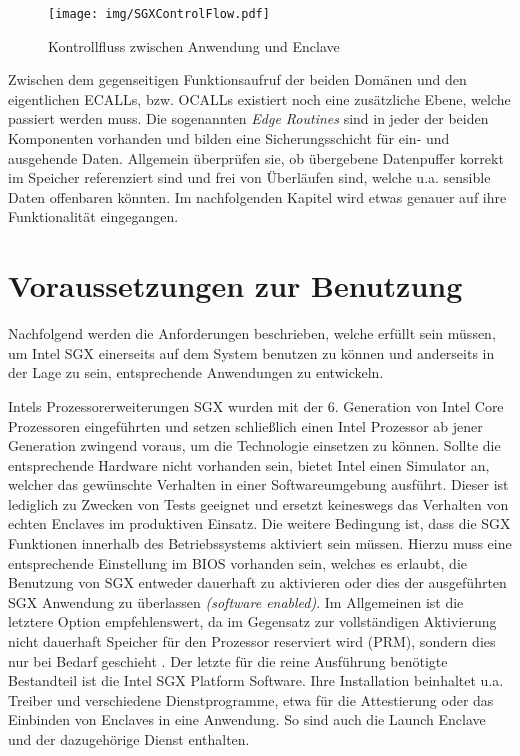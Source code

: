 \begin{figure}[h]
	\texttt{[image: img/SGXControlFlow.pdf]}
	\centering
	\caption{Kontrollfluss zwischen Anwendung und Enclave}
	\label{fig:sgxcontrolflow}
\end{figure}

Zwischen dem gegenseitigen Funktionsaufruf der beiden Domänen und den eigentlichen ECALLs, bzw. OCALLs existiert noch eine zusätzliche Ebene, welche passiert werden muss. Die sogenannten \textit{Edge Routines} sind in jeder der beiden Komponenten vorhanden und bilden eine Sicherungsschicht für ein- und ausgehende Daten. Allgemein überprüfen sie, ob übergebene Datenpuffer korrekt im Speicher referenziert sind und frei von Überläufen sind, welche u.a. sensible Daten offenbaren könnten. Im nachfolgenden Kapitel wird etwas genauer auf ihre Funktionalität eingegangen.

\section{Voraussetzungen zur Benutzung}

Nachfolgend werden die Anforderungen beschrieben, welche erfüllt sein müssen, um Intel SGX einerseits auf dem System benutzen zu können und anderseits in der Lage zu sein, entsprechende Anwendungen zu entwickeln.

Intels Prozessorerweiterungen SGX wurden mit der 6. Generation von Intel Core Prozessoren eingeführten und setzen schließlich einen Intel Prozessor ab jener Generation zwingend voraus, um die Technologie einsetzen zu können. Sollte die entsprechende Hardware nicht vorhanden sein, bietet Intel einen Simulator an, welcher das gewünschte Verhalten in einer Softwareumgebung ausführt. Dieser ist lediglich zu Zwecken von Tests geeignet und ersetzt keineswegs das Verhalten von echten Enclaves im produktiven Einsatz. Die weitere Bedingung ist, dass die SGX Funktionen innerhalb des Betriebssystems aktiviert sein müssen. Hierzu muss eine entsprechende Einstellung im BIOS vorhanden sein, welches es erlaubt, die Benutzung von SGX entweder dauerhaft zu aktivieren oder dies der ausgeführten SGX Anwendung zu überlassen \textit{(software enabled)}. Im Allgemeinen ist die letztere Option empfehlenswert, da im Gegensatz zur vollständigen Aktivierung nicht dauerhaft Speicher für den Prozessor reserviert wird (PRM), sondern dies nur bei Bedarf geschieht \cite{SGXDetection}. Der letzte für die reine Ausführung benötigte Bestandteil ist die Intel SGX Platform Software. Ihre Installation beinhaltet u.a. Treiber und verschiedene Dienstprogramme, etwa für die Attestierung oder das Einbinden von Enclaves in eine Anwendung. So sind auch die Launch Enclave und der dazugehörige Dienst enthalten.

